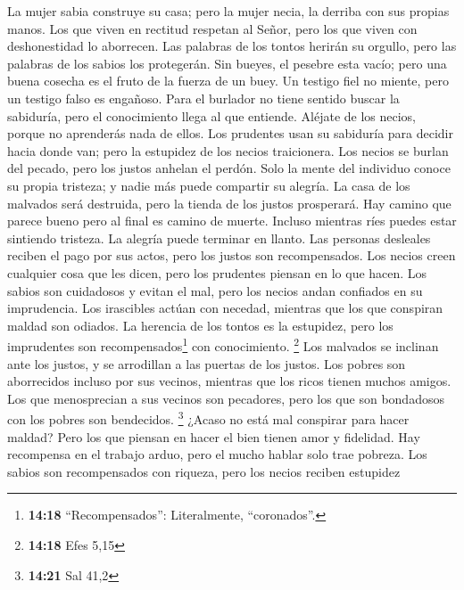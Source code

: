  La mujer sabia construye su casa; pero la mujer necia, la
derriba con sus propias manos.  Los que viven en rectitud
respetan al Señor, pero los que viven con deshonestidad lo aborrecen.
 Las palabras de los tontos herirán su orgullo, pero las
palabras de los sabios los protegerán.  Sin bueyes, el
pesebre esta vacío; pero una buena cosecha es el fruto de la fuerza de
un buey.  Un testigo fiel no miente, pero un testigo falso
es engañoso.  Para el burlador no tiene sentido buscar la
sabiduría, pero el conocimiento llega al que entiende. 
Aléjate de los necios, porque no aprenderás nada de ellos.
 Los prudentes usan su sabiduría para decidir hacia donde
van; pero la estupidez de los necios traicionera.  Los
necios se burlan del pecado, pero los justos anhelan el perdón.
 Solo la mente del individuo conoce su propia tristeza; y
nadie más puede compartir su alegría.  La casa de los
malvados será destruida, pero la tienda de los justos prosperará.
 Hay camino que parece bueno pero al final es camino de
muerte.  Incluso mientras ríes puedes estar sintiendo
tristeza. La alegría puede terminar en llanto.  Las
personas desleales reciben el pago por sus actos, pero los justos son
recompensados.  Los necios creen cualquier cosa que les
dicen, pero los prudentes piensan en lo que hacen.  Los
sabios son cuidadosos y evitan el mal, pero los necios andan confiados
en su imprudencia.  Los irascibles actúan con necedad,
mientras que los que conspiran maldad son odiados.  La
herencia de los tontos es la estupidez, pero los imprudentes son
recompensados\footnote{\textbf{14:18} ``Recompensados'': Literalmente,
  ``coronados''.} con conocimiento. \footnote{\textbf{14:18} Efes 5,15}
 Los malvados se inclinan ante los justos, y se
arrodillan a las puertas de los justos.  Los pobres son
aborrecidos incluso por sus vecinos, mientras que los ricos tienen
muchos amigos.  Los que menosprecian a sus vecinos son
pecadores, pero los que son bondadosos con los pobres son bendecidos.
\footnote{\textbf{14:21} Sal 41,2}  ¿Acaso no está mal
conspirar para hacer maldad? Pero los que piensan en hacer el bien
tienen amor y fidelidad.  Hay recompensa en el trabajo
arduo, pero el mucho hablar solo trae pobreza.  Los
sabios son recompensados con riqueza, pero los necios reciben estupidez
